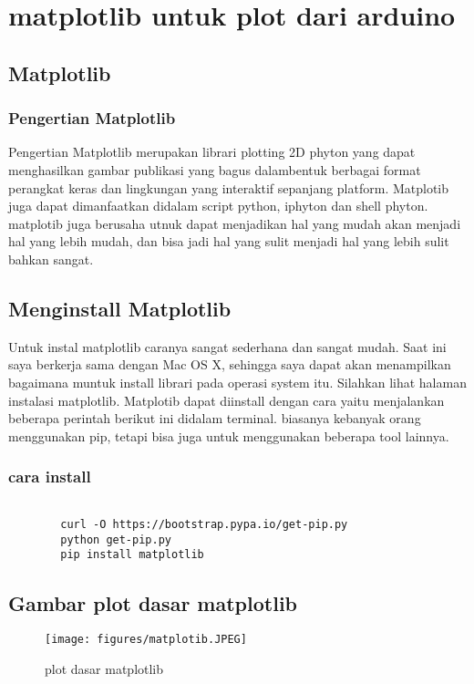 
\section {matplotlib untuk plot dari arduino}

\subsection {Matplotlib}
\subsubsection {Pengertian Matplotlib}
	Pengertian Matplotlib merupakan librari plotting 2D phyton yang dapat menghasilkan gambar publikasi yang bagus dalambentuk berbagai format perangkat keras dan lingkungan yang interaktif sepanjang platform. Matplotib juga dapat dimanfaatkan didalam script python, iphyton dan shell phyton. matplotib juga berusaha utnuk dapat menjadikan hal yang mudah akan menjadi hal yang lebih mudah, dan bisa jadi hal yang sulit menjadi hal yang lebih sulit bahkan sangat.
	
\subsection {Menginstall Matplotlib}
	Untuk instal matplotlib caranya sangat sederhana dan sangat mudah. Saat ini saya berkerja sama dengan Mac OS X, sehingga saya dapat akan menampilkan bagaimana muntuk install librari pada operasi system itu. Silahkan lihat halaman instalasi matplotlib.	Matplotib dapat diinstall dengan cara yaitu menjalankan beberapa perintah berikut ini didalam terminal. biasanya kebanyak orang menggunakan pip, tetapi bisa juga untuk menggunakan beberapa tool lainnya.

	\subsubsection{cara install}
	\begin{verbatim} 
	
		curl -O https://bootstrap.pypa.io/get-pip.py
		python get-pip.py
		pip install matplotlib

	\end{verbatim}
	
\subsection {Gambar plot dasar matplotlib}
	\begin{figure}[ht]
	\centerline{\texttt{[image: figures/matplotib.JPEG]}}
	\caption{plot dasar matplotlib}
	\label{Gambar}
	\end{figure}
      
